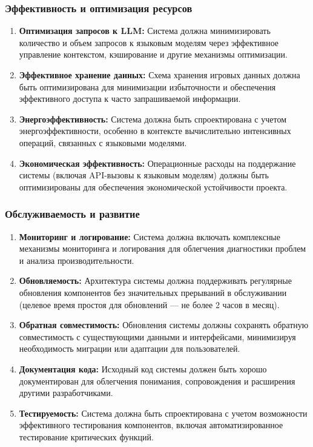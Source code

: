 \subsubsection{Эффективность и оптимизация ресурсов}

\begin{enumerate}[label=NFR\arabic*., resume]
    \item \textbf{Оптимизация запросов к LLM:} Система должна минимизировать количество и объем запросов к языковым моделям через эффективное управление контекстом, кэширование и другие механизмы оптимизации.

    \item \textbf{Эффективное хранение данных:} Схема хранения игровых данных должна быть оптимизирована для минимизации избыточности и обеспечения эффективного доступа к часто запрашиваемой информации.

    \item \textbf{Энергоэффективность:} Система должна быть спроектирована с учетом энергоэффективности, особенно в контексте вычислительно интенсивных операций, связанных с языковыми моделями.

    \item \textbf{Экономическая эффективность:} Операционные расходы на поддержание системы (включая API-вызовы к языковым моделям) должны быть оптимизированы для обеспечения экономической устойчивости проекта.
\end{enumerate}

\subsubsection{Обслуживаемость и развитие}

\begin{enumerate}[label=NFR\arabic*., resume]
    \item \textbf{Мониторинг и логирование:} Система должна включать комплексные механизмы мониторинга и логирования для облегчения диагностики проблем и анализа производительности.

    \item \textbf{Обновляемость:} Архитектура системы должна поддерживать регулярные обновления компонентов без значительных прерываний в обслуживании (целевое время простоя для обновлений — не более 2 часов в месяц).

    \item \textbf{Обратная совместимость:} Обновления системы должны сохранять обратную совместимость с существующими данными и интерфейсами, минимизируя необходимость миграции или адаптации для пользователей.

    \item \textbf{Документация кода:} Исходный код системы должен быть хорошо документирован для облегчения понимания, сопровождения и расширения другими разработчиками.

    \item \textbf{Тестируемость:} Система должна быть спроектирована с учетом возможности эффективного тестирования компонентов, включая автоматизированное тестирование критических функций.
\end{enumerate}

